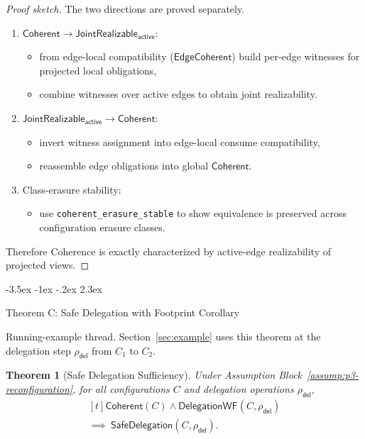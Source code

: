 \documentclass[a4paper,10pt,twocolumn,english]{article}
\makeatletter
\renewcommand{\section}{\@startsection{section}{1}{\z@}%
  {-3.5ex \@plus -1ex \@minus -.2ex}%
  {2.3ex}%
  {\raggedright\normalfont\large\bfseries}}
\numberwithin{equation}{section}
\theoremstyle{paperdef}
\theoremstyle{paperplain}
\newtheorem{theorem}[definition]{Theorem}
\theoremstyle{paperdef}
\theoremstyle{paperremark}
\theoremstyle{paperdef}
\newcommand{\Coherent}{\ensuremath{\mathsf{Coherent}}}
\makeatother
\begin{document}
\begin{proof}[Proof sketch]
	The two directions are proved separately.

	\begin{enumerate}
		\item $\Coherent \to \mathsf{JointRealizable}_{\mathsf{active}}$:
		      \begin{itemize}
			      \item from edge-local compatibility ($\mathsf{EdgeCoherent}$) build per-edge witnesses for projected local obligations,
			      \item combine witnesses over active edges to obtain joint realizability.
		      \end{itemize}
		\item $\mathsf{JointRealizable}_{\mathsf{active}} \to \Coherent$:
		      \begin{itemize}
			      \item invert witness assignment into edge-local consume compatibility,
			      \item reassemble edge obligations into global $\Coherent$.
		      \end{itemize}
		\item Class-erasure stability:
		      \begin{itemize}
			      \item use \nolinkurl{coherent_erasure_stable} to show equivalence is preserved across configuration erasure classes.
		      \end{itemize}
	\end{enumerate}

	Therefore Coherence is exactly characterized by active-edge realizability of projected views.
\end{proof}

\section{Theorem C: Safe Delegation with Footprint Corollary}
\label{sec:theorem-c}

Running-example thread. Section~\ref{sec:example} uses this theorem at the
delegation step $\rho_{\mathsf{del}}$ from $C_1$ to $C_2$.

\begin{theorem}[Safe Delegation Sufficiency]
	\label{thm:delegation}
	Under Assumption Block~\ref{assump:p3-reconfiguration}, for all configurations $C$ and delegation operations $\rho_{\mathsf{del}}$,
	\begin{equation}
		\begin{aligned}[t]
			\Coherent(C) \land \mathsf{DelegationWF}(C,\rho_{\mathsf{del}})
			\\
			\implies\ \mathsf{SafeDelegation}(C,\rho_{\mathsf{del}}).
		\end{aligned}
	\end{equation}
\end{theorem}
\end{document}
